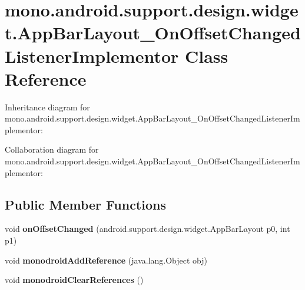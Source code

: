 \hypertarget{classmono_1_1android_1_1support_1_1design_1_1widget_1_1_app_bar_layout___on_offset_changed_listener_implementor}{}\section{mono.\+android.\+support.\+design.\+widget.\+App\+Bar\+Layout\+\_\+\+On\+Offset\+Changed\+Listener\+Implementor Class Reference}
\label{classmono_1_1android_1_1support_1_1design_1_1widget_1_1_app_bar_layout___on_offset_changed_listener_implementor}


Inheritance diagram for mono.\+android.\+support.\+design.\+widget.\+App\+Bar\+Layout\+\_\+\+On\+Offset\+Changed\+Listener\+Implementor\+:


Collaboration diagram for mono.\+android.\+support.\+design.\+widget.\+App\+Bar\+Layout\+\_\+\+On\+Offset\+Changed\+Listener\+Implementor\+:
\subsection*{Public Member Functions}
\begin{DoxyCompactItemize}
\item 
\mbox{\label{classmono_1_1android_1_1support_1_1design_1_1widget_1_1_app_bar_layout___on_offset_changed_listener_implementor_af1be42fc96cfda1bab1940dac3ed4b2c}} 
void {\bfseries on\+Offset\+Changed} (android.\+support.\+design.\+widget.\+App\+Bar\+Layout p0, int p1)
\item 
\mbox{\label{classmono_1_1android_1_1support_1_1design_1_1widget_1_1_app_bar_layout___on_offset_changed_listener_implementor_a94f7dac03362f2ea2f4b89d993e82cb6}} 
void {\bfseries monodroid\+Add\+Reference} (java.\+lang.\+Object obj)
\item 
\mbox{\label{classmono_1_1android_1_1support_1_1design_1_1widget_1_1_app_bar_layout___on_offset_changed_listener_implementor_a2bbedeb12ef96e9b75d0f95796625e8b}} 
void {\bfseries monodroid\+Clear\+References} ()
\end{DoxyCompactItemize}
